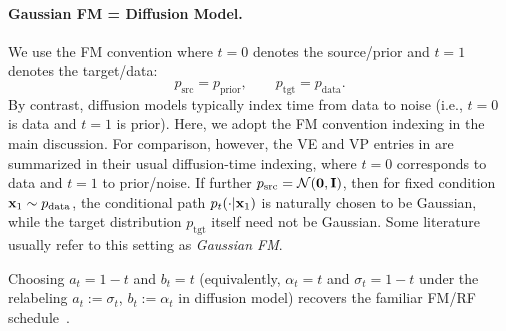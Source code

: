 \paragraph{Gaussian FM = Diffusion Model.}
We use the FM convention where $t=0$ denotes the source/prior and $t=1$ denotes the target/data:
\[
p_{\mathrm{src}}=p_{\mathrm{prior}},\qquad p_{\mathrm{tgt}}=p_{\mathrm{data}}.
\]
By contrast, diffusion models typically index time from data to noise (i.e., $t=0$ is data and $t=1$ is prior). 
Here, we adopt the FM convention indexing in the main discussion. For comparison, however, the VE and VP entries in  are summarized in their usual diffusion-time indexing, where $t=0$ corresponds to data and $t=1$ to prior/noise.
If further $p_{\mathrm{src}}=\mathcal N(\bm 0,{\mathbf{I}})$, then for fixed condition ${\mathbf{x}}_1\sim p_{\mathrm{data}}$, 
the conditional path $p_t(\cdot |{\mathbf{x}}_1)$ is naturally chosen to be Gaussian, 
while the target distribution $p_{\mathrm{tgt}}$ itself need not be Gaussian. Some literature usually refer to this setting as \emph{Gaussian FM}.



Choosing $a_t = 1-t$ and $b_t = t$ (equivalently, $\alpha_t = t$ and $\sigma_t = 1-t$ under the relabeling $a_t:=\sigma_t$, $b_t:=\alpha_t$ in diffusion model) recovers the familiar FM/RF schedule~\citep{lipman2022flow,liu2022rectified}.


